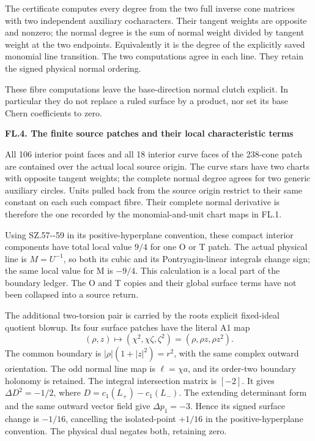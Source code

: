 The certificate 
computes every degree from the two full inverse cone
matrices with two independent auxiliary cocharacters.
Their tangent weights are opposite and nonzero; the
normal degree is the sum of normal weight divided by
tangent weight at the two endpoints. Equivalently it
is the degree of the explicitly saved monomial line
transition. The two computations agree in each line.
They retain the signed physical normal ordering.

These fibre computations leave the base-direction
normal clutch explicit. In particular they do not
replace a ruled surface by a product, nor set its
base Chern coefficients to zero.

\par

\medskip\noindent\textbf{FL.4. The finite source patches and their local characteristic terms}

\par\nobreak

All 106 interior point faces and all 18 interior
curve faces of the 238-cone patch are contained over
the actual local source origin. The curve stars
have two charts with opposite tangent weights;
the complete normal degree agrees for two generic
auxiliary circles. Units pulled back from the
source origin restrict to their same constant on
each such compact fibre. Their complete normal
derivative is therefore the one recorded by the
monomial-and-unit chart maps in FL.1.

Using SZ.57-\/-59 in its positive-hyperplane convention,
these compact interior components have total local
value \(9/4\) for one O or T patch. The actual
physical line is \(M=U^{-1}\), so both its cubic
and its Pontryagin-linear integrals change sign;
the same local value for M is \(-9/4\). This
calculation is a local part of the boundary ledger.
The O and T copies and their global surface terms
have not been collapsed into a source return.

The additional two-torsion pair is carried by the
root\textquotesingle s explicit fixed-ideal quotient blowup. Its
four surface patches have the literal A1 map
\[
 (\rho,z)\longmapsto(\chi^2,\chi\zeta,\zeta^2)
                  =(\rho,\rho z,\rho z^2).
\tag{FL.9}
\]
The common boundary is
\(|\rho|(1+|z|^2)=r^2\), with the same complex
outward orientation. The odd normal line map is
\(\ell=\chi a\), and its order-two boundary
holonomy is retained. The integral intersection
matrix is \([-2]\). It gives
\(\Delta D^2=-1/2\), where
\(D=c_1(L_+)-c_1(L_-)\). The extending determinant
form and the same outward vector field give
\(\Delta p_1=-3\). Hence its signed surface change
is \(-1/16\), cancelling the isolated-point
\(+1/16\) in the positive-hyperplane convention.
The physical dual negates both, retaining zero.

